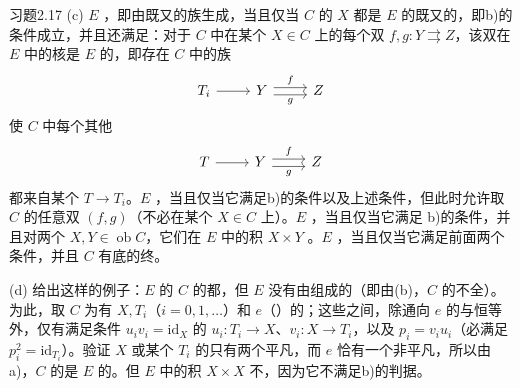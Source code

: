 \begin{SGAresult}{习题}{2.17}
(c) $E$ ，即由既又的族生成，当且仅当 $C$ 的 $X$ 都是 $E$ 的既又的，即b)的条件成立，并且还满足：对于 $C$ 中在某个 $X\in C$ 上的每个双 $f,g:Y\rightrightarrows Z$，该双在 $E$ 中的核是 $E$ 的，即存在 $C$ 中的族
\[
\begin{tikzcd}
T_i\arrow[r]&Y\arrow[r,shift left=.6ex,"f"]\arrow[r,shift right=.6ex,"g"']&Z
\end{tikzcd}
\]
使 $C$ 中每个其他
\[
\begin{tikzcd}
T\arrow[r]&Y\arrow[r,shift left=.6ex,"f"]\arrow[r,shift right=.6ex,"g"']&Z
\end{tikzcd}
\]
都来自某个 $T\to T_i$。$E$ ，当且仅当它满足b)的条件以及上述条件，但此时允许取 $C$ 的任意双 $(f,g)$（不必在某个 $X\in C$ 上）。$E$ ，当且仅当它满足
b)的条件，并且对两个 $X,Y\in\operatorname{ob}C$，它们在 $E$ 中的积 $X\times Y$ 。$E$ ，当且仅当它满足前面两个条件，并且 $C$ 有底的终。

(d) 给出这样的例子：$E$ 的 $C$ 的都，但 $E$ 没有由组成的（即由(b)，$C$ 的不全）。为此，取 $C$ 为有 $X,T_i$（$i=0,1,\ldots$）和 $e$（）的；这些之间，除通向 $e$ 的与恒等外，仅有满足条件 $u_iv_i=\mathrm{id}_X$ 的 $u_i:T_i\to X$、$v_i:X\to T_i$，以及 $p_i=v_iu_i$（必满足 $p_i^2=\mathrm{id}_{T_i}$）。验证 $X$ 或某个 $T_i$ 的只有两个平凡，而 $e$ 恰有一个非平凡，所以由a)，$C$ 的是 $E$ 的。但 $E$ 中的积 $X\times X$ 不，因为它不满足b)的判据。


\end{SGAresult}
